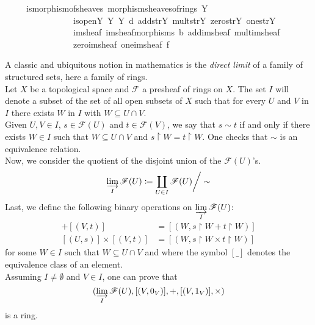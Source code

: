 \documentclass[12pt]{scrartcl}
\begin{document}
\begin{isabelle}
\ \ \ \ \ is{\isacharunderscore}{\kern0pt}morphism{\isacharunderscore}{\kern0pt}of{\isacharunderscore}{\kern0pt}sheaves{\isacharcolon}{\kern0pt}\ {\isachardoublequoteopen}morphism{\isacharunderscore}{\kern0pt}sheaves{\isacharunderscore}{\kern0pt}of{\isacharunderscore}{\kern0pt}rings\ Y\ \isanewline
\ \ \ \ \ \ \ \ \ \ \ \ \ \ \ \ is{\isacharunderscore}{\kern0pt}open\isactrlsub Y\ {\isasymO}\isactrlsub Y\ {\isasymrho}\isactrlsub Y\ d\ add{\isacharunderscore}{\kern0pt}str\isactrlsub Y\ mult{\isacharunderscore}{\kern0pt}str\isactrlsub Y\ zero{\isacharunderscore}{\kern0pt}str\isactrlsub Y\ one{\isacharunderscore}{\kern0pt}str\isactrlsub Y\isanewline
\ \ \ \ \ \ \ \ \ \ \ \ \ \ \ \ im{\isacharunderscore}{\kern0pt}sheaf\ im{\isacharunderscore}{\kern0pt}sheaf{\isacharunderscore}{\kern0pt}morphisms\ b\ add{\isacharunderscore}{\kern0pt}im{\isacharunderscore}{\kern0pt}sheaf\ mult{\isacharunderscore}{\kern0pt}im{\isacharunderscore}{\kern0pt}sheaf\ \isanewline
\ \ \ \ \ \ \ \ \ \ \ \ \ \ \ \ zero{\isacharunderscore}{\kern0pt}im{\isacharunderscore}{\kern0pt}sheaf\ one{\isacharunderscore}{\kern0pt}im{\isacharunderscore}{\kern0pt}sheaf\ {\isasymphi}\isactrlsub f{\isachardoublequoteclose}
\end{isabelle}

A classic and ubiquitous notion in mathematics is the \emph{direct limit} of a family of structured sets, here a family of rings. \\
Let $X$ be a topological space and $\mathscr{F}$ a presheaf of rings on $X$. The set $I$ will denote a subset of the set of all open subsets of $X$ such that for every $U$ and $V$ in $I$ there exists $W$ in $I$ with $W \subseteq U \cap V$. \\
Given $U, V \in I$, $s \in \mathscr{F}(U)$ and $t \in \mathscr{F}(V)$,  we say that 
$s \sim t$ if and only if there exists $W \in I$ such that $W \subseteq U \cap V$ and $s \restriction W = t \restriction W$. One checks that $\sim$ is an equivalence relation. \\
Now, we consider the quotient of the disjoint union of the $\mathscr{F}(U)$'s.
	\[
	\varinjlim_I \mathscr{F}(U) \coloneqq \coprod_{U \in I} \mathscr{F}(U) \bigg/ \sim 
	\]
Last, we define the following binary operations on $\displaystyle \varinjlim_{I} \mathscr{F}(U)$:
	\begin{align*}
	[(U, s)] + [(V, t)] & = [(W, s \restriction W + t \restriction W)] \\
	[(U, s)] \times [(V, t)] & = [(W, s \restriction W \times t \restriction W)]
	\end{align*}
for some $W \in I$ such that $W \subseteq U \cap V$ and where the symbol $[\_]$ denotes the equivalence class of an element. \\
Assuming $I \neq \emptyset$ and $V \in I$, one can prove that  
	\[
	(\varinjlim_I \mathscr{F}(U), [(V, 0_V)], +, [(V, 1_V)], \times)
	\]
is a ring. 
\end{document}
